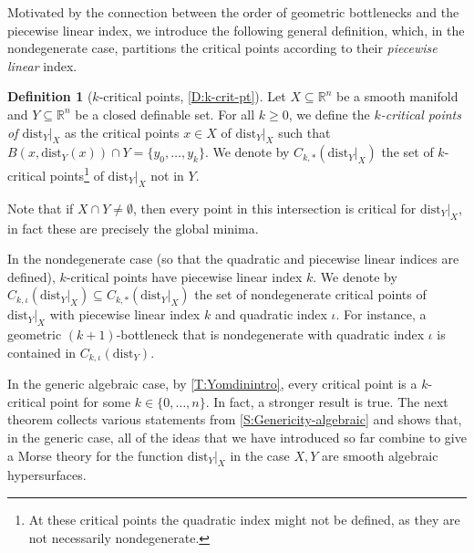 \documentclass{amsart}
\newcommand{\R}{\mathbb{R}}
\newcommand{\dd}{\mathrm{dist}}
\newcommand{\dist}{{\mathrm{dist}_Y|_X}}
\def\lini{k}
\def\quadi{\iota}
\theoremstyle{definition}
\newtheorem{definition}[subsubsection]{Definition}
\theoremstyle{remark}
\begin{document}
Motivated by the connection between the order of geometric bottlenecks and the piecewise linear index,
we introduce the following general definition, which, in the nondegenerate case, partitions the critical points according to their \emph{piecewise linear} index. 

\begin{definition}[$k$-critical points, \cref{D:k-crit-pt}]
\label{def:kcrit}
Let $X\subseteq \R^n$ be a smooth manifold and $Y\subseteq \R^n$ be a closed definable set. For all $k \geq 0$, we define the \emph{$k$-critical points of $\dist$} as the critical points $x \in X$ of $\dist$ such that  $B(x, \dd_Y(x)) \cap Y=\{y_0, \ldots, y_k\}$.
We denote by $C_{k, *}(\dist)$ the set of $k$-critical points\footnote{At these critical points the quadratic index might not be defined, as they are not necessarily nondegenerate.} of $\dist$ not in $Y$. 

Note that if $X\cap Y\neq \emptyset$, then every point in this intersection is critical for $\dist$, in fact these are precisely the global minima.

In the nondegenerate case (so that the quadratic and piecewise linear indices are defined), $k$-critical points have piecewise linear index $k$. We denote by $C_{\lini, \quadi}(\dist) \subseteq C_{\lini, *}(\dist)$ the set of nondegenerate critical points of $\dist$ with piecewise linear index $\lini$ and quadratic index $\quadi$.
For instance, a geometric $(k+1)$-bottleneck that is nondegenerate with quadratic index $\quadi$ is contained in $C_{\lini, \quadi}(\dd_Y)$.
\end{definition}


In the generic algebraic case, by \cref{T:Yomdinintro}, every critical point is a $k$-critical point for some $k \in \{0, \ldots, n\}$.
In fact, a stronger result is true. The next theorem collects various statements from \cref{S:Genericity-algebraic} and shows that, in the generic case, all of the ideas that we have introduced so far combine to give a Morse theory for the function $\dist$ in the case $X,Y$ are smooth algebraic hypersurfaces.
\end{document}
